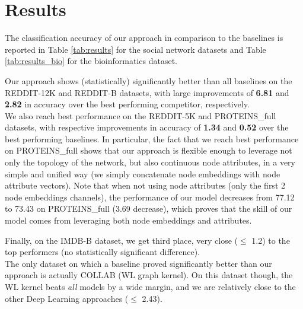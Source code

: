 \documentclass[sigconf]{acmart}
\begin{document}
\section{Results}
The classification accuracy of our approach in comparison to the baselines is reported in Table \ref{tab:results} for the social network datasets and Table \ref{tab:results_bio} for the bioinformatics dataset.

Our approach shows (statistically) significantly better than all baselines on the REDDIT-12K and REDDIT-B datasets, with large improvements of \textbf{6.81} and \textbf{2.82} in accuracy over the best performing competitor, respectively.\\
We also reach best performance on the REDDIT-5K and PROTEINS\_full datasets, with respective improvements in accuracy of \textbf{1.34} and \textbf{0.52} over the best performing baselines. In particular, the fact that we reach best performance on PROTEINS\_full shows that our approach is flexible enough to leverage not only the topology of the network, but also continuous node attributes, in a very simple and unified way (we simply concatenate node embeddings with node attribute vectors). Note that when not using node attributes (only the first 2 node embeddings channels), the performance of our model decreases from 77.12 to 73.43 on PROTEINS\_full (3.69 decrease), which proves that the skill of our model comes from  leveraging both node embeddings and attributes.

Finally, on the IMDB-B dataset, we get third place, very close ($\leq$ 1.2) to the top performers (no statistically significant difference). \\
The only dataset on which a baseline proved significantly better than our approach is actually COLLAB (WL graph kernel). On this dataset though, the WL kernel beats \textit{all} models by a wide margin, and we are relatively close to the other Deep Learning approaches ($\leq$ 2.43).
\end{document}
